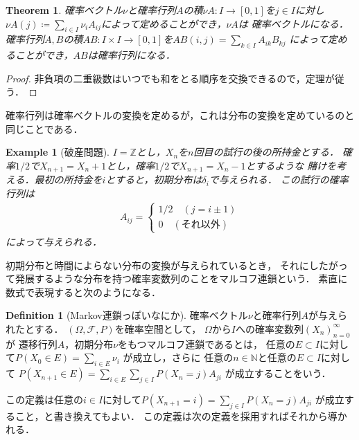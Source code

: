 \documentclass[dvipdfmx,autodetect-engine]{jsarticle}
\newtheorem{theorem}{Theorem}[section]
\newtheorem{example}{Example}[section]
\theoremstyle{remark}
\theoremstyle{definition}
\newtheorem{definition}{Definition}[section]
\newcommand{\N}{\mathbb{N}}
\newcommand{\Z}{\mathbb{Z}}
\begin{document}
\begin{theorem}
    確率ベクトル$\nu$と確率行列$A$の積$\nu A \colon I \to [0,1]$を$j \in I$に対し
    $\nu A (j) \coloneqq \sum_{i \in I} \nu_i A_{ij}$によって定めることができ，$\nu A$は
    確率ベクトルになる．
    確率行列$A,B$の積$AB \colon I\times I \to [0,1]$を$AB(i,j) = \sum_{k \in I} A_{ik}B_{kj}$
    によって定めることができ，$AB$は確率行列になる．
\end{theorem}


\begin{proof}
    非負項の二重級数はいつでも和をとる順序を交換できるので，定理が従う．
\end{proof}


確率行列は確率ベクトルの変換を定めるが，これは分布の変換を定めているのと
同じことである．

\begin{example}[破産問題]
    $I = \Z$とし，$X_n$を$n$回目の試行の後の所持金とする．
    確率$1/2$で$X_{n+1}=X_{n}+1$とし，確率$1/2$で$X_{n+1}=X_{n}-1$とするような
    賭けを考える．最初の所持金を$i$とすると，初期分布は$\delta_i$で与えられる．
    この試行の確率行列は
    \begin{align}
        A_{ij} = 
        \begin{cases}
            1/2 \quad (j = i \pm 1) \\
            0 \quad (\text{それ以外}) 
        \end{cases}
    \end{align}
    によって与えられる．
\end{example}


初期分布と時間によらない分布の変換が与えられているとき，
それにしたがって発展するような分布を持つ確率変数列のことをマルコフ連鎖という．
素直に数式で表現すると次のようになる．


\begin{definition}[Markov連鎖っぽいなにか]
    確率ベクトル$\nu$と確率行列$A$が与えられたとする．
    $(\Omega,\mathcal{F},P)$を確率空間として，
    $\Omega$から$I$への確率変数列$(X_n)_{n=0}^{\infty}$が
    遷移行列$A$，初期分布$\nu$をもつマルコフ連鎖であるとは，
    任意の$E \subset I$に対して$P(X_0 \in E) = \sum_{i \in E} \nu_{i}$
    が成立し，さらに
    任意の$n\in \N$と任意の$E \subset I$に対して
    $P(X_{n+1}\in E)=\sum_{i \in E} \sum_{j \in I} P(X_n = j) A_{ji}$
    が成立することをいう．
\end{definition}


この定義は任意の$i \in I$に対して$P(X_{n+1} = i)= \sum_{j \in I} P(X_n = j) A_{ji}$
が成立すること，と書き換えてもよい．
この定義は次の定義を採用すればそれから導かれる．
\end{document}
